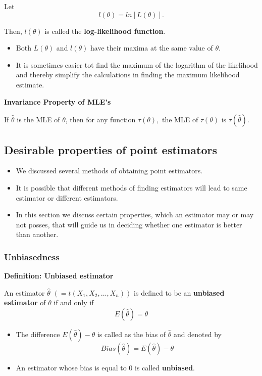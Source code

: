 \documentclass[]{book}
\providecommand{\tightlist}{%
  \setlength{\itemsep}{0pt}\setlength{\parskip}{0pt}}
\begin{document}
Let \[l(\theta) = ln[L(\theta)].\]

Then, \(l(\theta)\) is called the \textbf{log-likelihood function}.

\begin{itemize}
\tightlist
\item
  Both \(L(\theta)\) and \(l(\theta)\) have their maxima at the same value of \(\theta\).
\item
  It is sometimes easier tot find the maximum of the logarithm of the likelihood and thereby simplify the calculations in finding the maximum likelihood estimate.
\end{itemize}

\textbf{Invariance Property of MLE's}

If \(\hat{\theta}\) is the MLE of \(\theta\), then for any function \(\tau(\theta),\) the MLE of \(\tau(\theta)\) is \(\tau(\hat{\theta}).\)

\newpage

\hypertarget{desirable-properties-of-point-estimators}{%
\subsection{Desirable properties of point estimators}\label{desirable-properties-of-point-estimators}}

\begin{itemize}
\item
  We discussed several methods of obtaining point estimators.
\item
  It is possible that different methods of finding estimators will lead to same estimator or different estimators.
\item
  In this section we discuss certain properties, which an estimator may or may not posses, that will guide us in deciding whether one estimator is better than another.
\end{itemize}

\hypertarget{unbiasedness}{%
\subsubsection{Unbiasedness}\label{unbiasedness}}

\textbf{Definition: Unbiased estimator}

An estimator \(\hat{\theta}\) \((=t(X_1, X_2, \dots, X_n))\) is defined to be an \textbf{unbiased estimator} of \(\theta\) if and only if
\[E(\hat{\theta}) = \theta\]

\begin{itemize}
\item
  The difference \(E(\hat{\theta}) -\theta\) is called as the bias of \(\hat{\theta}\) and denoted by
  \[Bias(\hat{\theta}) = E(\hat{\theta}) - \theta \]
\item
  An estimator whose bias is equal to 0 is called \textbf{unbiased}.
\end{itemize}
\end{document}
